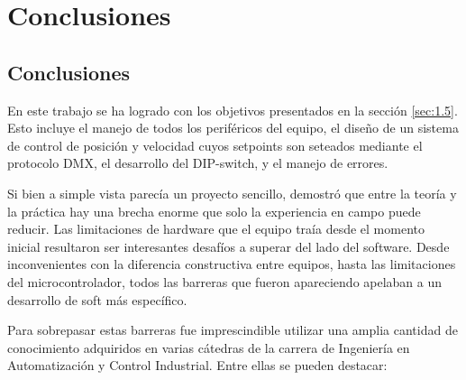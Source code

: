 \chapter{Conclusiones}
\thispagestyle{empty}

\section{Conclusiones} \label{sec:\thesection}
En este trabajo se ha logrado  con los objetivos presentados en la sección \ref{sec:1.5}. Esto incluye el manejo de todos los periféricos del equipo, el diseño de un sistema de control de posición y velocidad cuyos setpoints son seteados mediante el protocolo DMX, el desarrollo del DIP-switch, y el manejo de errores.


Si bien a simple vista parecía un proyecto sencillo, demostró que entre la teoría y la práctica hay una brecha enorme que solo la experiencia en campo puede reducir. Las limitaciones de hardware que el equipo traía desde el momento inicial resultaron ser interesantes desafíos a superar del lado del software. Desde inconvenientes con la diferencia constructiva entre equipos, hasta las limitaciones del microcontrolador, todos las barreras que fueron apareciendo apelaban a un desarrollo de soft más específico.

Para sobrepasar estas barreras fue  imprescindible utilizar una amplia cantidad de conocimiento adquiridos en varias cátedras de la carrera de Ingeniería en Automatización y Control Industrial. Entre ellas se pueden destacar:

